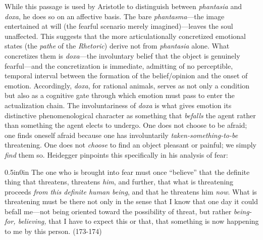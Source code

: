 While this passage is used by Aristotle to distinguish between \textit{phantasia} and \textit{doxa}, he does so on an affective basis. The bare \textit{phantasma}---the image entertained at will (the fearful scenario merely imagined)---leaves the soul unaffected. This suggests that the more articulationally concretized emotional states (the \textit{pathe} of the \textit{Rhetoric}) derive not from \textit{phantasia} alone. What concretizes them is \textit{doxa}---the involuntary belief that the object is genuinely fearful---and the concretization is immediate, admitting of no perceptible, temporal interval between the formation of the belief/opinion and the onset of emotion. Accordingly, \textit{doxa}, for rational animals, serves as not only a condition but also as a cognitive gate through which emotion must pass to enter the actualization chain. The involuntariness of \textit{doxa} is what gives emotion its distinctive phenomenological character as something that \textit{befalls} the agent rather than something the agent elects to undergo. One does not choose to be afraid; one finds oneself afraid because one has involuntarily \textit{taken-something-to-be} threatening. One does not \textit{choose} to find an object pleasant or painful; we simply \textit{find} them so. Heidegger pinpoints this specifically in his analysis of fear: 
\begin{adjustwidth}{0.5in}{0in}
    The one who is brought into fear must once ``believe'' that the definite thing that threatens, threatens \textit{him}, and further, that what is threatening proceeds \textit{from this definite human being}, and that he threatens him \textit{now}. What is threatening must be there not only in the sense that I know that one day it could befall me---not being oriented toward the possibility of threat, but rather \textit{being-for, believing,} that I have to expect this or that, that something is now happening to me by this person. (173-174)
\end{adjustwidth}
